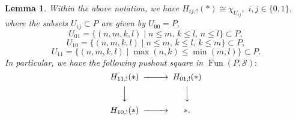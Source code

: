 \documentclass[11pt,leqno]{amsart}
\newtheorem{lemma}[theo]{Lemma}
\numberwithin{equation}{section}
\newcommand{\cS}{{\mathcal S}}
\newcommand{\Fun}{\operatorname{Fun}}
\begin{document}
\begin{lemma}\label{lem:left_Kan_extensions} Within the above notation, we have $H_{ij,!}(\ast)\cong \chi_{U_{ij}},$ $i,j\in\{0,1\},$ where the subsets $U_{ij}\subset P$ are given by $U_{00}=P,$
\begin{equation*}
U_{01}=\{(n,m,k,l)\mid n\leq m,\,k\leq l,\,n\leq l\}\subset P,	
\end{equation*}
\begin{equation*}
U_{10}=\{(n,m,k,l)\mid n\leq m,\,k\leq l,\,k\leq m\}\subset P,	
\end{equation*}
\begin{equation*}
U_{11} = \{(n,m,k,l)\mid \max(n,k)\leq \min(m,l)\}\subset P.
\end{equation*}
In particular, we have the following pushout square in $\Fun(P,\cS):$
\begin{equation}\label{eq:pushout_of_left_Kan_extensions}
\begin{CD}
	H_{11,!}(\ast) @>>> H_{01,!}(\ast)\\
	@VVV @VVV\\
	H_{10,!}(\ast) @>>> \ast.
\end{CD}
\end{equation}
\end{lemma}
\end{document}
